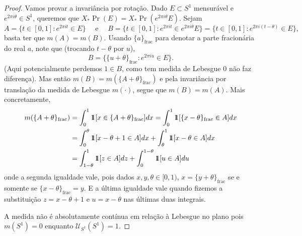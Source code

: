\begin{proof}
	Vamos provar a invariância por rotação. Dado $E \subset S^1$
	mensurável e $e^{2\pi i\theta} \in S^1$, queremos
	que $X_*\Pr(E) = X_*\Pr(e^{2\pi i \theta}E)$. Sejam
	\[
		A = \{t \in [0,1]: e^{2\pi i t} \in E\} \quad \text{ e } \quad B =
		\{t \in [0,1]: e^{2\pi i t} \in e^{2\pi i \theta}E\} = \{t \in [0,
		1] : e^{2\pi i (t - \theta)} \in E\},
	\]
	basta ter que $m(A) = m(B)$. Usando $\{a\}_\text{frac}$ para denotar
	a parte fracionária do real $a$, note que (trocando $t - \theta$ por $u$),
	\[
		B  = \{ \{u +
		\theta\}_\text{frac} : e^{2\pi i u} \in E\}.
	\]
	(Aqui potencialmente perdemos $1 \in B$, como tem medida de Lebesgue
	0 não faz diferença).
	Mas então $m(B) = m(\{A + \theta\}_\text{frac})$ e pela invariância
	por translação da medida de Lebesgue $m(\cdot)$,
	segue que $m(B) = m(A)$. Mais concretamente,
	\begin{align*}
		m(\{A + \theta\}_\text{frac}) &= \int_0^1 \id[x \in \{A +
		\theta\}_\text{frac}] dx = \int_0^1 \id[\{x - \theta\}_\text{frac} \in A] dx\\
		&= \int_0^{\theta} \id[x - \theta + 1 \in A]dx +
		\int_{\theta}^{1}\id[x - \theta \in A] dx\\
		&= \int_{1-\theta}^{1} \id[z \in A] dz + \int_{0}^{1-\theta} \id[u \in A] du
	\end{align*}
	onde a segunda igualdade vale, pois dados $x,y,\theta \in [0,1)$, $x
	= \{y + \theta\}_\text{frac}$ se e somente se $\{x - \theta\}_\text{frac} = y$.
	E a última igualdade vale quando fizemos a substituição $z = x -
	\theta + 1$ e $u = x - \theta$ nas últimas duas integrais.


	A medida não é absolutamente contínua em relação à Lebesgue no plano
	pois $m(S^1) = 0$ enquanto $\mathcal{U}_{S^1}(S^1) = 1$.
\end{proof}

